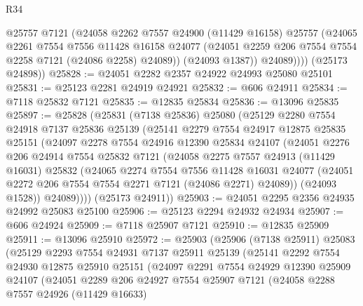 \begin{lexlean}{R34}
\begin{coremodule}
              @25757
              @7121
              (@24058
                @2262
                @7557
                @24900
                (@11429 @16158)
                @25757
                (@24065
                  @2261
                  @7554
                  @7556
                  @11428
                  @16158
                  @24077
                  (@24051 @2259 @206 @7554 @7554 @2258 @7121 (@24086 @2258) @24089))
                (@24093 @1387))
              @24089))))
      (@25173 @24898))
@25828 := @24051 @2282 @2357 @24922 @24993 @25080 @25101
@25831 := @25123 @2281 @24919 @24921
@25832 := @606 @24911
@25834 := @7118 @25832 @7121
@25835 := @12835 @25834
@25836 := @13096 @25835
@25897 := @25828
    (@25831
      (@7138 @25836)
      @25080
      (@25129
        @2280
        @7554
        @24918
        @7137
        @25836
        @25139
        (@25141
          @2279
          @7554
          @24917
          @12875
          @25835
          @25151
          (@24097
            @2278
            @7554
            @24916
            @12390
            @25834
            @24107
            (@24051
              @2276
              @206
              @24914
              @7554
              @25832
              @7121
              (@24058
                @2275
                @7557
                @24913
                (@11429 @16031)
                @25832
                (@24065
                  @2274
                  @7554
                  @7556
                  @11428
                  @16031
                  @24077
                  (@24051 @2272 @206 @7554 @7554 @2271 @7121 (@24086 @2271) @24089))
                (@24093 @1528))
              @24089))))
      (@25173 @24911))
@25903 := @24051 @2295 @2356 @24935 @24992 @25083 @25100
@25906 := @25123 @2294 @24932 @24934
@25907 := @606 @24924
@25909 := @7118 @25907 @7121
@25910 := @12835 @25909
@25911 := @13096 @25910
@25972 := @25903
    (@25906
      (@7138 @25911)
      @25083
      (@25129
        @2293
        @7554
        @24931
        @7137
        @25911
        @25139
        (@25141
          @2292
          @7554
          @24930
          @12875
          @25910
          @25151
          (@24097
            @2291
            @7554
            @24929
            @12390
            @25909
            @24107
            (@24051
              @2289
              @206
              @24927
              @7554
              @25907
              @7121
              (@24058
                @2288
                @7557
                @24926
                (@11429 @16633)

\end{coremodule}
\end{lexlean}

